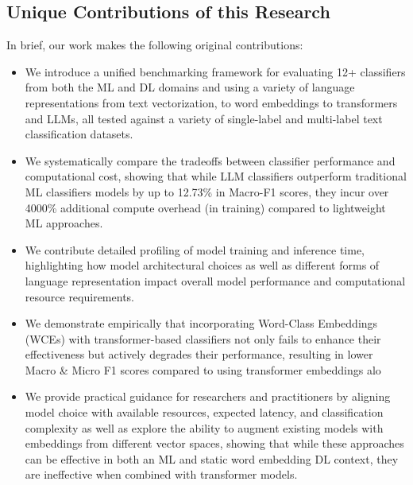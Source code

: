 \documentclass[final]{clv2025-revised}
\begin{document}
\subsection{Unique Contributions of this Research}

In brief, our work makes the following original contributions:

\begin{itemize}

\item We introduce a unified benchmarking framework for evaluating 12+ classifiers from both the ML and DL domains and using a variety of language representations from text vectorization, to word embeddings to transformers and LLMs, all tested against a variety of single-label and multi-label text classification datasets.
\item We systematically compare the tradeoffs between classifier performance and computational cost, showing that while LLM classifiers outperform traditional ML classifiers models by up to 12.73\% in Macro-F1 scores, they incur over 4000\% additional compute overhead (in training) compared to lightweight ML approaches.
\item We contribute detailed profiling of model training and inference time, highlighting how model architectural choices as well as different forms of language representation impact overall model performance and computational resource requirements.
\item We demonstrate empirically that incorporating Word-Class Embeddings (WCEs) with transformer-based classifiers not only fails to enhance their effectiveness but actively degrades their performance, resulting in lower Macro \& Micro F1 scores compared to using transformer embeddings alo
\item We provide practical guidance for researchers and practitioners by aligning model choice with available resources, expected latency, and classification complexity as well as explore the ability to augment existing models with embeddings from different vector spaces, showing that while these approaches can be effective in both an ML and static word embedding DL context, they are ineffective when combined with transformer models.
\end{itemize}
\end{document}
